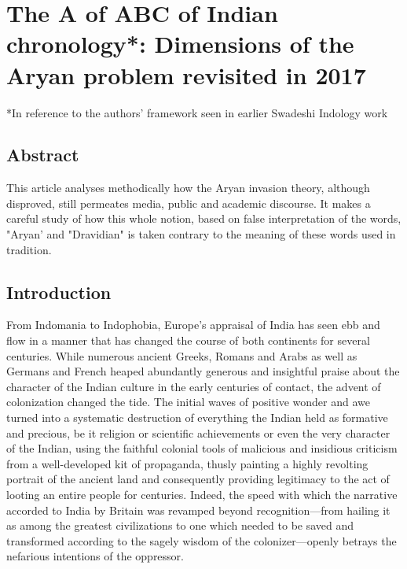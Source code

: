 
\chapter{The A of ABC of Indian chronology*: Dimensions of the Aryan problem revisited in 2017}\label{chapter2}


*In reference to the authors’ framework seen in earlier Swadeshi Indology work

\section*{Abstract}

This article analyses methodically how the Aryan invasion theory, although disproved, still permeates media, public and academic discourse. It makes a careful study of how this whole notion, based on false interpretation of the words, "Aryan' and "Dravidian" is taken contrary to the meaning of these words used in tradition.


\section{Introduction}

From Indomania to Indophobia, Europe’s appraisal of India has seen ebb and flow in a manner that has changed the course of both continents for several centuries. While numerous ancient Greeks, Romans and Arabs as well as Germans and French heaped abundantly generous and insightful praise about the character of the Indian culture in the early centuries of contact, the advent of colonization changed the tide. The initial waves of positive wonder and awe turned into a systematic destruction of everything the Indian held as formative and precious, be it religion or scientific achievements or even the very character of the Indian, using the faithful colonial tools of malicious and insidious criticism from a well-developed kit of propaganda, thusly painting a highly revolting portrait of the ancient land and consequently providing legitimacy to the act of looting an entire people for centuries. Indeed, the speed with which the narrative accorded to India by Britain was revamped beyond recognition—from hailing it as among the greatest civilizations to one which needed to be saved and transformed according to the sagely wisdom of the colonizer—openly betrays the nefarious intentions of the oppressor.

